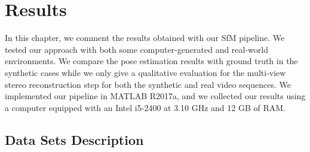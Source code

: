 \chapter{Results}
In this chapter, we comment the results obtained with our SfM pipeline.
We tested our approach with both some computer-generated and real-world environments.
We compare the pose estimation results with ground truth in the synthetic cases
while we only give a qualitative evaluation for the multi-view stereo
reconstruction step for both the synthetic and real video sequences.
We implemented our pipeline in MATLAB R2017a, and we collected our results using
a computer equipped with an Intel i5-2400 at 3.10 GHz and 12 GB of RAM.

\section{Data Sets Description}
